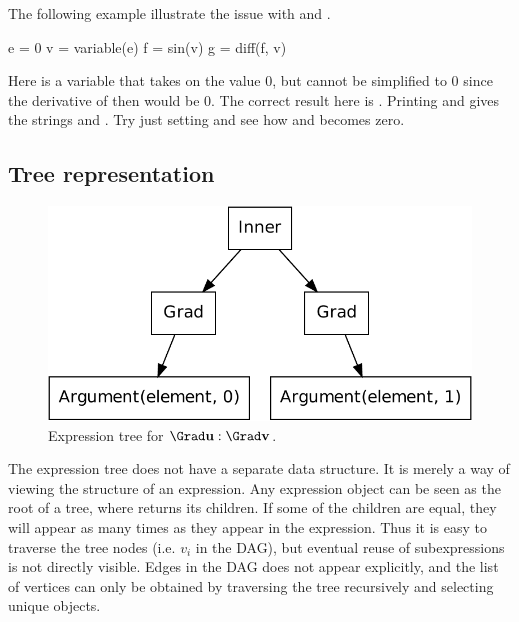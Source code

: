 The following example illustrate the issue with  and .
\begin{python}
e = 0
v = variable(e)
f = sin(v)
g = diff(f, v)
\end{python}
Here  is a variable that takes on the value 0, but
 cannot be simplified to 0 since the derivative of
 then would be 0.  The correct result here is . Printing  and  gives the strings
 and .
Try just setting  and see how  and 
becomes zero.


\subsection{Tree representation}

\begin{figure}[tb]
\centering
\includegraphics[width=\largefig]{chapters/alnes-1/pdf/stiffness.pdf}
\caption{Expression tree for $\Grad \uu : \Grad \vv$.}
\label{ufl:fig:stiffness}
\end{figure}

The expression tree does not have a separate data structure. It is
merely a way of viewing the structure of an expression. Any expression
object  can be seen as the root of a tree, where
 returns its children. If some of the children are
equal, they will appear as many times as they appear in the
expression. Thus it is easy to traverse the tree nodes (i.e. $v_i$ in
the DAG), but eventual reuse of subexpressions is not directly
visible. Edges in the DAG does not appear explicitly, and the list of
vertices can only be obtained by traversing the tree recursively and
selecting unique objects.

